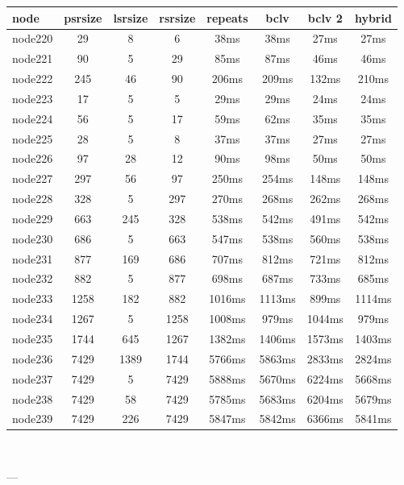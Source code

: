 \begin{tabular}{|l|c|c|c|c|c|c|c|}
\hline node & psrsize & lsrsize & rsrsize   & repeats & bclv & bclv 2 & hybrid\\
    \hline node220 & 29 & 8 & 6 & 38ms & 38ms & 27ms & 27ms\\
    \hline node221 & 90 & 5 & 29 & 85ms & 87ms & 46ms & 46ms\\
    \hline node222 & 245 & 46 & 90 & 206ms & 209ms & 132ms & 210ms\\
    \hline node223 & 17 & 5 & 5 & 29ms & 29ms & 24ms & 24ms\\
    \hline node224 & 56 & 5 & 17 & 59ms & 62ms & 35ms & 35ms\\
    \hline node225 & 28 & 5 & 8 & 37ms & 37ms & 27ms & 27ms\\
    \hline node226 & 97 & 28 & 12 & 90ms & 98ms & 50ms & 50ms\\
    \hline node227 & 297 & 56 & 97 & 250ms & 254ms & 148ms & 148ms\\
    \hline node228 & 328 & 5 & 297 & 270ms & 268ms & 262ms & 268ms\\
    \hline node229 & 663 & 245 & 328 & 538ms & 542ms & 491ms & 542ms\\
    \hline node230 & 686 & 5 & 663 & 547ms & 538ms & 560ms & 538ms\\
    \hline node231 & 877 & 169 & 686 & 707ms & 812ms & 721ms & 812ms\\
    \hline node232 & 882 & 5 & 877 & 698ms & 687ms & 733ms & 685ms\\
    \hline node233 & 1258 & 182 & 882 & 1016ms & 1113ms & 899ms & 1114ms\\
    \hline node234 & 1267 & 5 & 1258 & 1008ms & 979ms & 1044ms & 979ms\\
    \hline node235 & 1744 & 645 & 1267 & 1382ms & 1406ms & 1573ms & 1403ms\\
    \hline node236 & 7429 & 1389 & 1744 & 5766ms & 5863ms & 2833ms & 2824ms\\
    \hline node237 & 7429 & 5 & 7429 & 5888ms & 5670ms & 6224ms & 5668ms\\
    \hline node238 & 7429 & 58 & 7429 & 5785ms & 5683ms & 6204ms & 5679ms\\
    \hline node239 & 7429 & 226 & 7429 & 5847ms & 5842ms & 6366ms & 5841ms\\

\hline
\end{tabular} \

---


